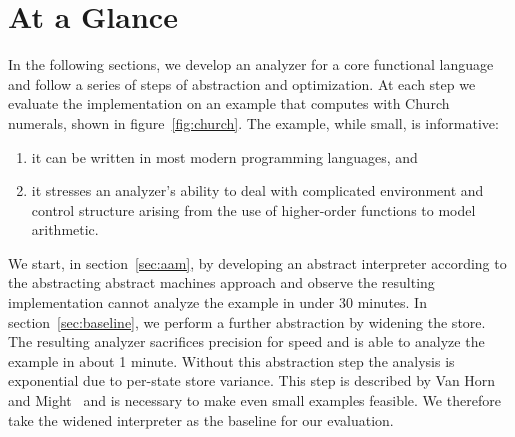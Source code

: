 \documentclass[preprint,onecolumn,9pt]{sigplanconf} %
\begin{document}





\section{At a Glance}

In the following sections, we develop an analyzer for a core
functional language and follow a series of steps of abstraction and
optimization.  At each step we evaluate the implementation on an
example that computes with Church numerals, shown in
figure~\ref{fig:church}.
The example, while small, is informative:
\begin{enumerate}
\item it can be written in most modern programming languages, and
%
\item it stresses an analyzer's ability to deal with complicated
environment and control structure arising from the use of higher-order
functions to model arithmetic.
\end{enumerate}

We start, in section~\ref{sec:aam}, by developing an abstract
interpreter according to the abstracting abstract machines approach
and observe the resulting implementation cannot analyze the example in
under 30 minutes.  In section~\ref{sec:baseline}, we perform a further
abstraction by widening the store.  The resulting analyzer sacrifices
precision for speed and is able to analyze the example in about 1
minute.  Without this abstraction step the analysis is exponential due
to per-state store variance.  This step is described by Van Horn and
Might~\cite[\S 3.5--6]{dvanhorn:VanHorn2012Systematic} and is
necessary to make even small examples feasible.  We therefore take the
widened interpreter as the baseline for our evaluation.
\end{document}
